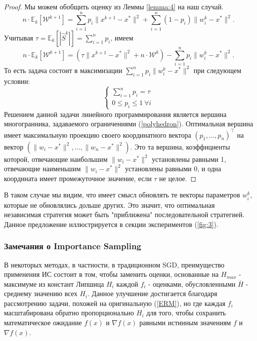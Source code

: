 \documentclass{article}
\theoremstyle{definition}
\theoremstyle{assumption}
\theoremstyle{lemma}
\theoremstyle{theorem}
\theoremstyle{proposition}
\begin{document}
	\begin{proof}
		Мы можем обобщить оценку из Леммы \ref{lemma:4} на наш случай.
		\begin{equation}
			n \cdot \mathbb E_k[\mathcal W^{k+1}] = \sum \limits_{i=1}^n p_i  \| x^{k+1} - x^* \|^2 + \sum \limits_{i=1}^n \left(1 - p_i \right) \|w_i^k - x^*\|^2.
		\end{equation}
		Учитывая $\tau = \mathbb E_k[|\hat S^k|] = \sum \limits_{i=1}^n p_i$, имеем
		\begin{equation}
			n \cdot \mathbb E_k[\mathcal W^{k+1}] = \left( \tau  \| x^{k+1} - x^* \|^2 + n \cdot \mathcal W^k \right) - \sum \limits_{i=1}^n p_i \|w_i^k - x^*\|^2.
		\end{equation}
		То есть задача состоит в максимизации $\sum \limits_{i=1}^n p_i \|w_i^k - x^*\|^2$ при следующем условии:
		\begin{equation} \label{polyhedron}
			\begin{cases}
				\sum \limits_{i=1}^n p_i = \tau \\
				0 \leqslant p_i \leqslant 1\ \forall i
			\end{cases}
		\end{equation}
		Решением данной задачи линейного программирования является вершина многогранника, задаваемого ограничениями (\ref{polyhedron}). Оптимальная вершина имеет максимальную проекцию своего координатного вектора $(p_1, ..., p_n)^\top$ на вектор $(\|w_i - x^*\|^2, ..., \|w_n - x^*\|^2)$. Это та вершина, коэффициенты которой, отвечающие наибольшим $\|w_i - x^*\|^2$ установлены равными 1, отвечающие наименьшим $\|w_i - x^*\|^2$ установлены равными 0, и одна координата имеет промежуточное значение, если $\tau$ не целое.
	\end{proof}
	
	В таком случае мы видим, что имеет смысл обновлять те векторы параметров $w_i^k$, которые не обновлялись дольше других. Это значит, что оптимальная независимая стратегия может быть "приближена" последовательной стратегией. Данное предложение иллюстрируется в секции экспериментов (\ref{fig:3}).
	
	
	\subsubsection{Замечания о Importance Sampling}
	
	В некоторых методах, в частности, в традиционном SGD, преимущество применения ИС состоит в том, чтобы заменить оценки, основанные на $H_{max}$ - максимуме из констант Липшица $H_i$ каждой $f_i$ - оценками, обусловленными $\overline H$ - среднему значению всех $H_i$. Данное улучшение достигается благодаря рассмотрению задачи, похожей на оригинальную (\ref{ERM}), но где каждая $f_i$ масштабирована обратно пропорционально $H_i$ для того, чтобы сохранить математическое ожидание  $f(x)$ и $\nabla f(x)$ равными истинным значениям $f$ и $\nabla f(x)$.
	
\end{document}
